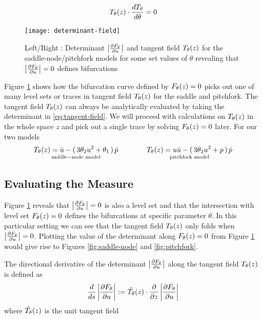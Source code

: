 \begin{align} %
    \tangent(z)\cdot\frac{d\tangent}{d\theta}=0
\end{align}
\begin{figure}
\centering
\texttt{[image: determinant-field]}
\caption{Left/Right : Determinant $\left| \frac{\partial F_{\theta}}{\partial u} \right|$ and tangent field $T_{\theta}(z)$ for the saddle-node/pitchfork models for some set values of $\theta$ revealing that $\left| \frac{\partial F_{\theta}}{\partial u} \right|=0$ defines bifurcations}
\label{fig:determinant-field}
\end{figure}

Figure \ref{fig:determinant-field} shows how the bifurcation curve defined by $F_{\theta}(z)=0$ picks out one of many level sets or traces in tangent field $T_{\theta}(z)$ for the saddle and pitchfork. The tangent field $T_{\theta}(z)$ can always be analytically evaluated by taking the determinant in \eqref{eq:tangent-field}. We will proceed with calculations on $T_{\theta}(z)$ in the whole space $z$ and pick out a single trace by solving $F_{\theta}(z)=0$ later. For our two models
\begin{align}
    \underset{\mathrm{saddle-node\,\,model}}{
    T_{\theta}(z)=\hat{u}-(\,3\theta_2 u^2+\theta_1\,)\,\hat{p}}
    \qquad\qquad
    \underset{\mathrm{pitchfork\,\,model}}{
    T_{\theta}(z)=u\hat{u}-(\,3\theta_2 u^2+p\,)\,\hat{p}}
    \label{eq:tangent-field-examples}
\end{align}

\subsection{Evaluating the Measure}
\label{section:measure}

Figure \ref{fig:determinant-field} reveals that $\left| \frac{\partial F_{\theta}}{\partial u} \right|=0$ is also a level set and that the intersection with level set $F_{\theta}(z)=0$ defines the bifurcations at specific parameter $\theta$. In this particular setting we can see that the tangent field $T_{\theta}(z)$ only folds when $\left| \frac{\partial F_{\theta}}{\partial u} \right|=0$. Plotting the value of the determinant along $F_{\theta}(z)=0$ from Figure \ref{fig:determinant-field} would give rise to Figures \ref{fig:saddle-node} and \ref{fig:pitchfork}.

The directional derivative of the determinant $\left| \frac{\partial F_{\theta}}{\partial u} \right|$ along the tangent field $T_{\theta}(z)$ is defined as
\begin{align}
    \frac{d}{ds}\left| \frac{\partial F_{\theta}}{\partial u} \right| := \hat{T_{\theta}}(z) \cdot \frac{\partial}{\partial z}\left| \frac{\partial F_{\theta}}{\partial u} \right| 
\end{align}
where $\hat{T_{\theta}}(z)$ is the unit tangent field


